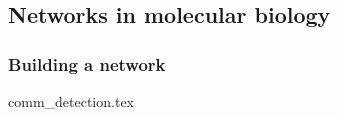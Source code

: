 \subsection{Networks in molecular biology}

\subsubsection{Building a network}


{comm_detection.tex}
